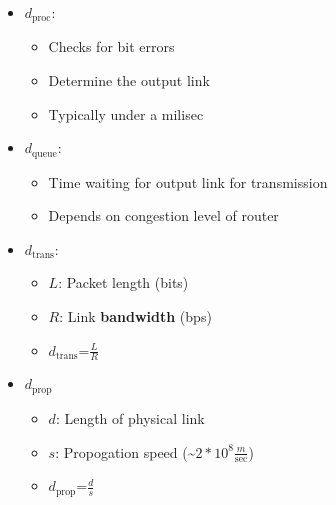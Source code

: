 \documentclass[12pt]{report}
\begin{document}
\begin{itemize}
  \item $d_{\text{proc}}$:
        \begin{itemize}
          \item Checks for bit errors
          \item Determine the output link
                \item Typically under a milisec
        \end{itemize}
        \item $d_{\text{queue}}$:
        \begin{itemize}
          \item Time waiting for output link for transmission
                \item Depends on congestion level of router
        \end{itemize}
        \item $d_{\text{trans}}$:
        \begin{itemize}
                \item $L$: Packet length (bits)
                \item $R$: Link \textbf{bandwidth} (bps)
                \item \textbf{$d_{\text{trans}}$}=$\frac{L}{R}$
        \end{itemize}
        \item $d_{\text{prop}}$
        \begin{itemize}
          \item $d$: Length of physical link
                \item $s$: Propogation speed (\~$2*10^{8}\frac{m}{\text{sec}}$)
                \item \textbf{$d_{\text{prop}}$}=$\frac{d}{s}$
        \end{itemize}
\end{itemize}
\end{document}

